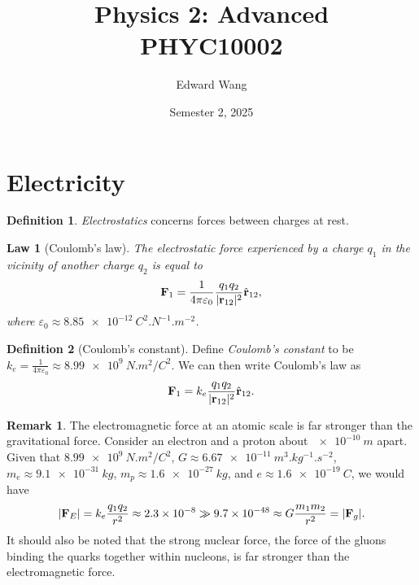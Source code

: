 \documentclass[a4paper]{scrartcl}
\newtheorem{law}{Law}
\theoremstyle{definition}
\newtheorem{definition}{Definition}
\newtheorem{remark}{Remark}
\DeclarePairedDelimiter\abs{\lvert}{\rvert}
\let\epsilon\varepsilon
\let\vec\mathbf
\begin{document}
\title{Physics 2: Advanced \\ PHYC10002}
\author{Edward Wang}
\date{Semester 2, 2025}
\maketitle

\tableofcontents

\section{Electricity}

\begin{definition}
  \emph{Electrostatics} concerns forces between charges at rest.
\end{definition}

\begin{law}[Coulomb's law]
  The electrostatic force experienced by a charge $q_1$ in the vicinity of another charge $q_2$ is equal to \[
    \vec{F}_{1} = \frac{1}{4\pi \epsilon_0} \frac{q_1q_2}{\abs{\vec{r}_{12}}^2}\hat{\vec{r}}_{12},
  \] 
  where $\epsilon_0 \approx \qty{8.85e-12}{C^2.N^{-1}.m^{-2}}$.
\end{law}

\begin{definition}[Coulomb's constant]
  Define \emph{Coulomb's constant} to be $k_e = \frac{1}{4\pi\epsilon_0} \approx \qty{8.99e9}{N.m^2/C^2}$. We can then write Coulomb's law as \[
    \vec{F}_{1} = k_e\frac{q_1q_2}{\abs{\vec{r}_{12}}^2}\hat{\vec{r}}_{12}.
  \] 
\end{definition}

\begin{remark}
  The electromagnetic force at an atomic scale is far stronger than the gravitational force. Consider an electron and a proton about $\qty{e-10}{m}$ apart. Given that $\qty{8.99e9}{N.m^2/C^2}$, $G\approx \qty{6.67e-11}{m^3.kg^{-1}.s^{-2}}$, $m_e \approx \qty{9.1e-31}{kg}$, $m_p \approx \qty{1.6e-27}{kg}$, and $e \approx \qty{1.6e-19}{C}$, we would have  \[
    \abs{\vec{F}_E} = k_e\frac{q_1q_2}{r^2} \approx 2.3 \times 10^{-8} \gg 9.7 \times 10^{-48} \approx G \frac{m_1m_2}{r^2} = \abs{\vec{F}_g}.
  \] 
  It should also be noted that the strong nuclear force, the force of the gluons binding the quarks together within nucleons, is far stronger than the electromagnetic force.
\end{remark}
\end{document}
